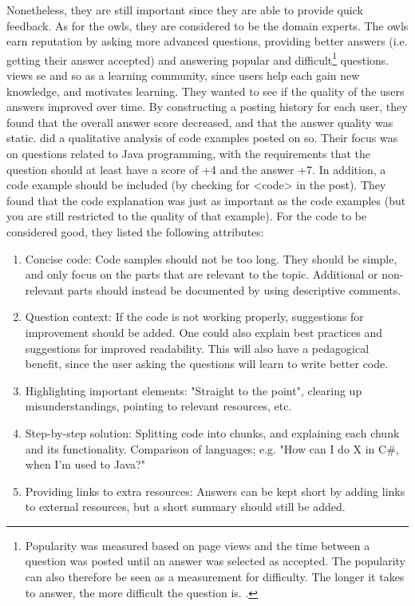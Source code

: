 Nonetheless, they are still important since they are able to provide quick feedback.
As for the owls, they are considered to be the domain experts.
The owls earn reputation by asking more advanced questions, providing better answers (i.e. getting their answer accepted) and answering popular and difficult\footnote{
	Popularity was measured based on page views and the time between a question was posted until an answer was selected as accepted.
	The popularity can also therefore be seen as a measurement for difficulty.
	The longer it takes to answer, the more difficult the question is. 
	\cite[p.~273]{Yang2014}.
} questions.
\vspace{0.5em}\newline
\textcite{Posnett2012} views \gls{se} and \gls{so} as a learning community, since users help each gain new knowledge, and motivates learning.
They wanted to see if the quality of the users answers improved over time. 
By constructing a posting history for each user, they found that the overall answer score decreased, and that the answer quality was static.
\vspace{0.5em}\newline
\textcite{Nasehi2012} did a qualitative analysis of code examples posted on \gls{so}. 
Their focus was on questions related to Java programming, with the requirements that the question should at least have a score of +4 and the answer +7. 
In addition, a code example should be included (by checking for <code> in the post).
They found that the code explanation was just as important as the code examples (but you are still restricted to the quality of that example).
For the code to be considered good, they listed the following attributes: 
\begin{enumerate}
	\item Concise code: Code samples should not be too long. 
	They should be simple, and only focus on the parts that are relevant to the topic.
	Additional or non-relevant parts should instead be documented by using descriptive comments.
	\item Question context: 
	If the code is not working properly, suggestions for improvement should be added. 
	One could also explain best practices and suggestions for improved readability.
	This will also have a pedagogical benefit, since the user asking the questions will learn to write better code.
	\item Highlighting important elements: 
	"Straight to the point", clearing up misunderstandings, pointing to relevant resources, etc.
	\item Step-by-step solution: 
	Splitting code into chunks, and explaining each chunk and its functionality.
	Comparison of languages; e.g. "How can I do X in C\#, when I'm used to Java?"
	\item Providing links to extra resources: 
	Answers can be kept short by adding links to external resources, but a short summary should still be added.
\end{enumerate}


